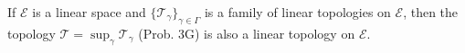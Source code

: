 If $\mathcal{E}$ is a linear space and $\{\mathcal{T}_\gamma\}_{\gamma \in \Gamma}$ is a family of linear topologies on $\mathcal{E}$, then the topology $\mathcal{T} = \sup_{\gamma} \mathcal{T}_\gamma$ (Prob. 3G) is also a linear topology on $\mathcal{E}$.
